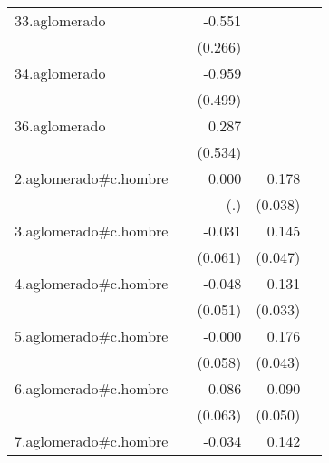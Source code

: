 {\begin{longtable}{l*{4}{D{.}{.}{-1}}}
\addlinespace
33.aglomerado&                     &      -0.551\sym{*}  &                     &                     \\
            &                     &     (0.266)         &                     &                     \\
\addlinespace
34.aglomerado&                     &      -0.959         &                     &                     \\
            &                     &     (0.499)         &                     &                     \\
\addlinespace
36.aglomerado&                     &       0.287         &                     &                     \\
            &                     &     (0.534)         &                     &                     \\
\addlinespace
2.aglomerado#c.hombre&                     &       0.000         &       0.178\sym{***}&                     \\
            &                     &         (.)         &     (0.038)         &                     \\
\addlinespace
3.aglomerado#c.hombre&                     &      -0.031         &       0.145\sym{**} &                     \\
            &                     &     (0.061)         &     (0.047)         &                     \\
\addlinespace
4.aglomerado#c.hombre&                     &      -0.048         &       0.131\sym{***}&                     \\
            &                     &     (0.051)         &     (0.033)         &                     \\
\addlinespace
5.aglomerado#c.hombre&                     &      -0.000         &       0.176\sym{***}&                     \\
            &                     &     (0.058)         &     (0.043)         &                     \\
\addlinespace
6.aglomerado#c.hombre&                     &      -0.086         &       0.090         &                     \\
            &                     &     (0.063)         &     (0.050)         &                     \\
\addlinespace
7.aglomerado#c.hombre&                     &      -0.034         &       0.142\sym{**} &                     \\

\end{longtable}}

